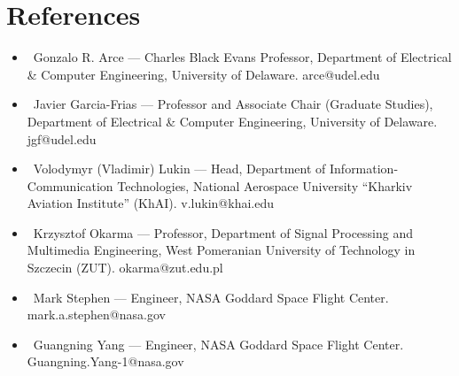 \documentclass[letterpaper,10pt]{article}
\newcommand{\resumeItem}[1]{\item\small{#1}}
\newcommand{\resumeSubHeadingList}{\begin{itemize}[leftmargin=0.15in, label={}]}
\newcommand{\resumeSubHeadingListEnd}{\end{itemize}}
\begin{document}
\section{References}
\resumeSubHeadingList
  \resumeItem{\textbullet\ Gonzalo R. Arce --- Charles Black Evans Professor, Department of Electrical \& Computer Engineering, University of Delaware. arce@udel.edu}
  \resumeItem{\textbullet\ Javier Garcia-Frias --- Professor and Associate Chair (Graduate Studies), Department of Electrical \& Computer Engineering, University of Delaware. jgf@udel.edu}
  \resumeItem{\textbullet\ Volodymyr (Vladimir) Lukin --- Head, Department of Information-Communication Technologies, National Aerospace University ``Kharkiv Aviation Institute'' (KhAI). v.lukin@khai.edu}
  \resumeItem{\textbullet\ Krzysztof Okarma --- Professor, Department of Signal Processing and Multimedia Engineering, West Pomeranian University of Technology in Szczecin (ZUT). okarma@zut.edu.pl}
  \resumeItem{\textbullet\ Mark Stephen --- Engineer, NASA Goddard Space Flight Center. mark.a.stephen@nasa.gov}
  \resumeItem{\textbullet\ Guangning Yang --- Engineer, NASA Goddard Space Flight Center. Guangning.Yang-1@nasa.gov}
\resumeSubHeadingListEnd
\end{document}
